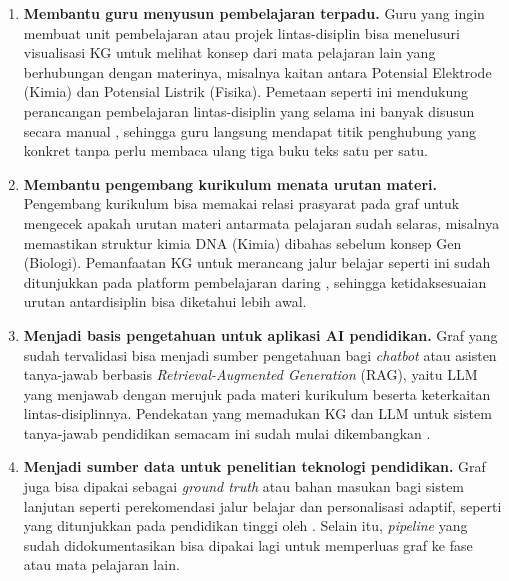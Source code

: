 \documentclass[../../thesis]{subfiles}
\begin{document}
\begin{enumerate}
  \item \textbf{Membantu guru menyusun pembelajaran terpadu.} Guru yang ingin
        membuat unit pembelajaran atau projek lintas-disiplin bisa menelusuri
        visualisasi KG untuk melihat konsep dari mata pelajaran lain yang
        berhubungan dengan materinya, misalnya kaitan antara Potensial Elektrode
        (Kimia) dan Potensial Listrik (Fisika). Pemetaan seperti ini mendukung
        perancangan pembelajaran lintas-disiplin yang selama ini banyak disusun
        secara manual \parencite{abdel-radi_interdisciplinary_2025}, sehingga
        guru langsung mendapat titik penghubung yang konkret tanpa perlu membaca
        ulang tiga buku teks satu per satu.

  \item \textbf{Membantu pengembang kurikulum menata urutan materi.} Pengembang
        kurikulum bisa memakai relasi prasyarat pada graf untuk mengecek apakah
        urutan materi antarmata pelajaran sudah selaras, misalnya memastikan
        struktur kimia DNA (Kimia) dibahas sebelum konsep Gen (Biologi).
        Pemanfaatan KG untuk merancang jalur belajar seperti ini sudah
        ditunjukkan pada platform pembelajaran daring
        \parencite{zhang_learning_2023}, sehingga ketidaksesuaian urutan
        antardisiplin bisa diketahui lebih awal.

  \item \textbf{Menjadi basis pengetahuan untuk aplikasi AI pendidikan.} Graf
        yang sudah tervalidasi bisa menjadi sumber pengetahuan bagi \textit{chatbot}
        atau asisten tanya-jawab berbasis \textit{Retrieval-Augmented Generation}
        (RAG), yaitu LLM yang menjawab dengan merujuk pada materi kurikulum
        beserta keterkaitan lintas-disiplinnya. Pendekatan yang memadukan KG dan
        LLM untuk sistem tanya-jawab pendidikan semacam ini sudah mulai
        dikembangkan
        \parencite{researcher_silcion_valley_chapter-oxford_alumni_enhancing_2025}.

  \item \textbf{Menjadi sumber data untuk penelitian teknologi pendidikan.} Graf
        juga bisa dipakai sebagai \textit{ground truth} atau bahan masukan bagi
        sistem lanjutan seperti perekomendasi jalur belajar dan personalisasi
        adaptif, seperti yang ditunjukkan pada pendidikan tinggi oleh
        \textcite{abu-rasheed_llm-assisted_2025}. Selain itu, \textit{pipeline}
        yang sudah didokumentasikan bisa dipakai lagi untuk memperluas graf ke
        fase atau mata pelajaran lain.
\end{enumerate}
\end{document}

